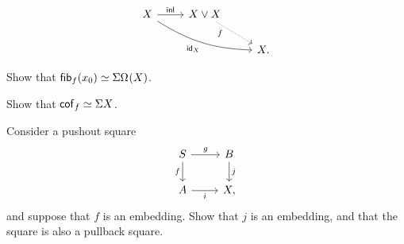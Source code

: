 \begin{exercises}
\begin{equation*}
\begin{tikzcd}
X \arrow[r,"\inl"] \arrow[drr,bend right=15,swap,"{\idfunc[X]}"] & X\vee X \arrow[dr,densely dotted,near start,swap,"f"] \\
& & X.
\end{tikzcd}
\end{equation*}
\begin{subexenum}
\item Show that $\eqv{\fib{f}{x_0}}{\susp\loopspace{X}}$. 
\item Show that $\eqv{\mathsf{cof}_f}{\susp X}$.
\end{subexenum}
\exercise Consider a pushout square
\begin{equation*}
\begin{tikzcd}
S \arrow[r,"g"] \arrow[d,swap,"f"] & B \arrow[d,"j"] \\
A \arrow[r,swap,"i"] & X,
\end{tikzcd}
\end{equation*}
and suppose that $f$ is an embedding. Show that $j$ is an embedding, and that the square is also a pullback square.
\end{exercises}
